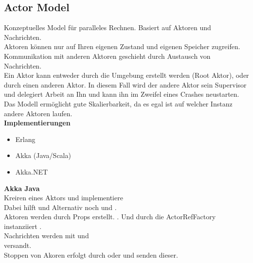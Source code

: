 \subsection{Actor Model}%
\label{pp:sub:actor-model}
Konzeptuelles Model für paralleles Rechnen. Basiert auf Aktoren und Nachrichten.\\
Aktoren können nur auf Ihren eigenen Zustand und eigenen Speicher zugreifen. Kommunikation mit anderen Aktoren geschieht
durch Austausch von Nachrichten. \\
Ein Aktor kann entweder durch die Umgebung erstellt werden (Root Aktor),
oder durch einen anderen Aktor. In diesem Fall wird der andere Aktor sein Supervisor und delegiert Arbeit an Ihn und
kann ihn im Zweifel eines Crashes neustarten.\\
Das Modell ermöglicht gute Skalierbarkeit, da es egal ist auf welcher Instanz andere Aktoren laufen.\\
\textbf{Implementierungen}
\begin{itemize}
  \item Erlang
  \item Akka (Java/Scala)
  \item Akka.NET
\end{itemize}
\textbf{Akka Java}\\
Kreiren eines Aktors  und implementiere \\
Dabei hilft  und 
Alternativ noch  und .\\
Aktoren werden durch Props erstellt. .
Und durch die ActorRefFactory instanziiert .\\
Nachrichten werden mit  und\\
versandt.\\
Stoppen von Akoren erfolgt durch  oder  und senden dieser.